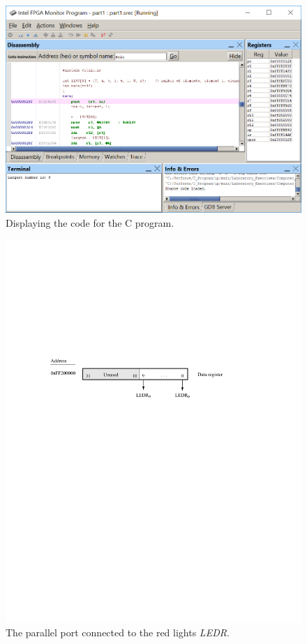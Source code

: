 \documentclass[epsfig,10pt,fullpage]{article}
\begin{document}
\clearpage

\begin{figure}[htb]
	\begin{center}
	\includegraphics[scale=0.8]{figures/figureMP_goto.png}
	\end{center}
	\caption{Displaying the code for the C program.}
\label{fig:MPgoto}
\end{figure}

\begin{figure}[htb]
	\begin{center}
	\includegraphics[scale=1]{figures/figureLEDR.pdf}
	\end{center}
	\caption{The parallel port connected to the red lights {\it LEDR}.}
\label{fig:LEDR}
\end{figure}
\end{document}
